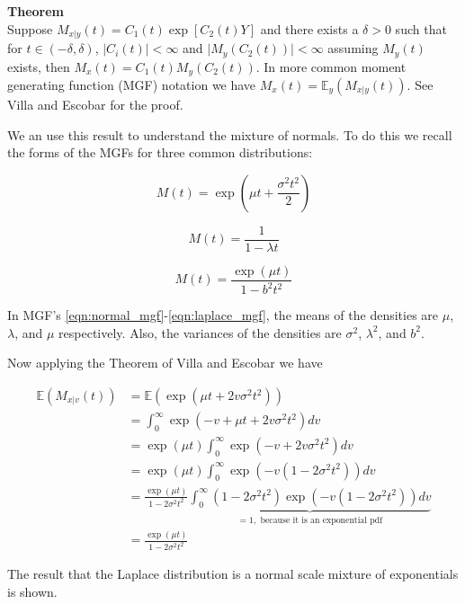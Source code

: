 \noindent \textbf{Theorem}\\

Suppose $M_{x\vert y}(t)=C_1(t)\exp[C_2(t)Y]$ and there exists a $\delta>0$ such that for $t\in(-\delta, \delta)$, $\vert C_i(t) \vert < \infty$  and $\vert M_y(C_2(t))\vert < \infty$ assuming $M_y(t)$ exists, then $M_x(t) =C_1(t)M_y(C_2(t))$. In more common moment generating function (MGF)  notation we have $M_x(t) = \mathbb{E}_y(M_{x\vert y}(t))$. 
See Villa and Escobar for the proof. 

We an use this result to understand the mixture of normals. To do this we recall the forms of the MGFs for three common distributions: 

\begin{equation}\label{eqn:normal_mgf}
M(t) = \exp\left(\mu t + \frac{\sigma^2t^2}{2}\right)
\end{equation}

\begin{equation}\label{eqn:exponential_mgf}
M(t) =\frac{1}{1-\lambda t}
\end{equation}

\begin{equation}\label{eqn:laplace_mgf}
M(t) = \frac{ \exp\left(\mu t\right) }{1-b^2t^2}
\end{equation}

In MGF's \ref{eqn:normal_mgf}-\ref{eqn:laplace_mgf}, the means of the densities are $\mu$, $\lambda$, and $\mu$ respectively. Also, the variances of the densities are $\sigma^2$, $\lambda^2$, and $b^2$.  

Now applying the Theorem of Villa and Escobar we have 

\begin{align*}
\mathbb{E}\left(M_{x\vert v}(t)\right)&=\mathbb{E}\left(\exp\left(\mu t +2v\sigma^2t^2  \right)\right) \\
&= \int_0^\infty \exp\left(-v +\mu t +2v\sigma^2t^2  \right)dv\\
&= \exp(\mu t) \int_0^\infty \exp\left(-v +2v\sigma^2t^2  \right)dv\\
&= \exp(\mu t) \int_0^\infty \exp\left(-v(1-2\sigma^2t^2)\right)dv\\
&= \frac{\exp(\mu t) }{1-2\sigma^2t^2} \underbrace{\int_0^\infty(1-2\sigma^2t^2)\exp\left(-v(1-2\sigma^2t^2)\right)dv}_{=1, \text{  because it is an exponential pdf}}\\
&= \frac{\exp(\mu t) }{1-2\sigma^2t^2}
\end{align*}

The result that the Laplace distribution is a normal scale mixture of exponentials is shown. 
